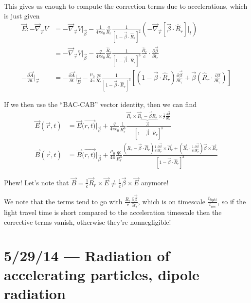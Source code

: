 \documentclass[10pt]{report}
\newcommand{\pd}[2]{\frac{\partial #1}{\partial#2}}
\begin{document}
This gives us enough to compute the correction terms due to accelerations, which is just given
\begin{align}
    \vec{E} : -\vec{\nabla}_{\vec{r}}V &= -\vec{\nabla}_{\vec{r}}V\Bigg|_{\vec{\beta}} - \frac{1}{4\pi\epsilon_0}\frac{q}{R_r}\frac{1}{\left[ 1 - \vec{\beta} \cdot \hat{R}_r \right]^2}\left( -\vec{\nabla}_{\vec{r}}\left[ \vec{\beta} \cdot \hat{R}_r \right]\Big|_t \right)\\
    &= -\vec{\nabla}_{\vec{r}}V\Bigg|_{\vec{\beta}} - \frac{q}{4\pi\epsilon_0}\frac{\hat{R}_r}{R_r}\frac{1}{\left[ 1 - \vec{\beta} \cdot \hat{R}_r \right]^3}\frac{\hat{R}_r}{c}\cdot \pd{\vec{\beta}}{t_r}\\
    -\pd{\vec{A}}{t}\Bigg|_{\vec{r}} &= -\pd{\vec{A}}{t}\Bigg|_{\vec{B}} - \frac{\mu_0}{4\pi}\frac{qc}{R_r} \frac{1}{\left[ 1 - \vec{\beta} \cdot \hat{R}_r \right]^3} \left[ \left( 1 - \vec{\beta} \cdot \hat{R}_r \right)\pd{\vec{\beta}}{t_r} + \vec{\beta}\left( \hat{R}_r \cdot \pd{\beta}{t_r} \right) \right]
\end{align}

If we then use the ``BAC-CAB'' vector identity, then we can find
\begin{align}
    \vec{E}(\vec{r},t) &= \vec{E}(\vec{r,t)}\Big|_{\vec{\beta}} + \frac{q}{4\pi\epsilon_0}\frac{1}{R_r^3}\frac{\vec{R}_r \times \underbrace{\vec{R}_r - \vec{\beta}R_r}_{\vec{R}} \times \frac{1}{c}\pd{\vec{\beta}}{t_r}}{\left[ 1 - \vec{\beta} \cdot \hat{R}_r \right]^3}\\
    \vec{B}(\vec{r},t) &= \vec{B}(\vec{r,t)}\Big|_{\vec{\beta}}+ \frac{\mu_0 }{4\pi}\frac{qc}{R_r^3}\frac{(R_r - \vec{\beta} \cdot \hat{R}_r)\frac{1}{c}\pd{\vec{\beta}}{t_r}\times \vec{R}_r + \left( \vec{R}_r \cdot \frac{1}{c}\pd{\vec{\beta}}{t_r} \right)\vec{\beta} \times \vec{R}_r}{\left[ 1 - \vec{\beta} \cdot \hat{R}_r \right]^3}
\end{align}

Phew! Let's note that $\vec{B} = \frac{1}{c}\vec{R}_r \times \vec{E} \neq \frac{1}{c}\vec{\beta} \times \vec{E}$ anymore!

We note that the terms tend to go with $\frac{R_r}{c}\pd{\vec{\beta}}{t_r}$, which is on timescale $\frac{t_{light}}{t_{acc}}$, so if the light travel time is short compared to the acceleration timescale then the corrective terms vanish, otherwise they're nonnegligible!

\chapter{5/29/14 --- Radiation of accelerating particles, dipole radiation}
\end{document}
